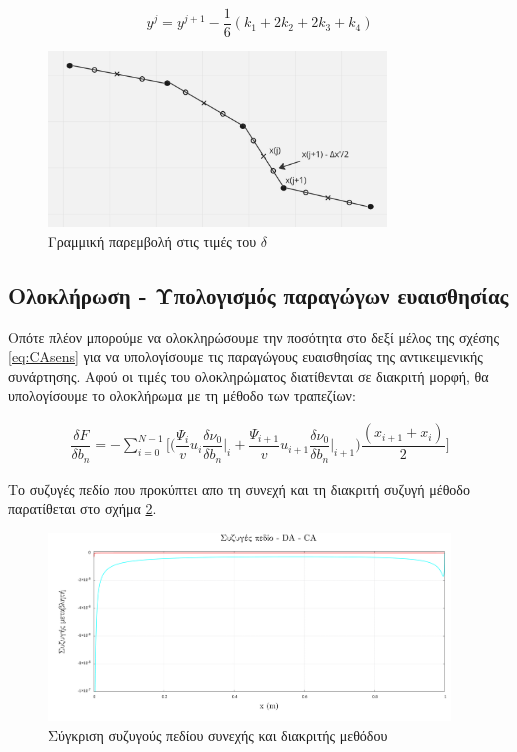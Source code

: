 $$y^{j} = y^{j+1} - \dfrac{1}{6}(k_1 + 2k_2 + 2k_3 + k_4) $$

\begin{figure}[h!]
    \centering
    \includegraphics[width=0.8\textwidth]{figures/2nd_runge.png}
    \caption{Γραμμική παρεμβολή στις τιμές του $\delta$}
    \label{fig:interp}
\end{figure}

\subsection{Ολοκλήρωση - Υπολογισμός παραγώγων ευαισθησίας}

Οπότε πλέον μπορούμε να ολοκληρώσουμε την ποσότητα στο δεξί μέλος της σχέσης \ref{eq:CAsens} για να υπολογίσουμε τις παραγώγους ευαισθησίας της αντικειμενικής συνάρτησης. Αφού οι τιμές του ολοκληρώματος διατίθενται σε διακριτή μορφή, θα υπολογίσουμε το ολοκλήρωμα με τη μέθοδο των τραπεζίων:

\begin{align}
    \dfrac{\delta F}{\delta b_n} = - \sum^{N-1}_{i=0}\Bigg[\Big(\dfrac{\Psi_i}{v}u_i\dfrac{\delta \nu_0}{\delta b_n}\big|_i + \dfrac{\Psi_{i+1}}{v}u_{i+1}\dfrac{\delta \nu_0}{\delta b_n}\big|_{i+1}\Big)\dfrac{(x_{i+1} + x_i)}{2}\Bigg]
\end{align}

Το συζυγές πεδίο που προκύπτει απο τη συνεχή και τη διακριτή συζυγή μέθοδο παρατίθεται στο σχήμα \ref{fig:cadaComp}.

\begin{figure}[h!]
    \begin{center}
        \includegraphics[width=0.95\textwidth]{figures/ca-vs-da.pdf}
    \end{center}
    \caption{Σύγκριση συζυγούς πεδίου συνεχής και διακριτής μεθόδου}
    \label{fig:cadaComp}
\end{figure}


